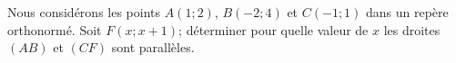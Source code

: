
\begin{exercice}\label{exosmath-0704}

    Nous considérons les points \( A(1;2)\), \( B(-2;4)\) et \( C(-1;1)\) dans un repère orthonormé. Soit \( F(x;x+1)\); déterminer pour quelle valeur de \( x\) les droites \( (AB)\) et \( (CF)\) sont parallèles.

\end{exercice}
